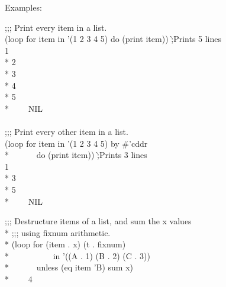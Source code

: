 \begin{defloop}
Examples:
\begin{lisp}
;;; Print every item in a list. \\[3pt]
(loop for item in '(1 2 3 4 5) do (print item)) \`;\textrm{Prints 5 lines} \\
1 \\*
2 \\*
3 \\*
4 \\*
5 \\*
~~~\EV~NIL \\
 \\
;;; Print every other item in a list. \\[3pt]
(loop for item in '(1 2 3 4 5) by \#'cddr \\*
~~~~~~do (print item))  \`;\textrm{Prints 3 lines} \\
1 \\*
3 \\*
5 \\*
~~~\EV~NIL
\end{lisp}
\begin{lisp}
;;; Destructure items of a list, and sum the x values \\*
;;; using fixnum arithmetic. \\*
(loop for (item . x) (t . fixnum) \\*
~~~~~~~~~~in '((A . 1) (B . 2) (C . 3)) \\*
~~~~~~unless (eq item 'B) sum x) \\*
~~~\EV~4
\end{lisp}
\end{defloop}

